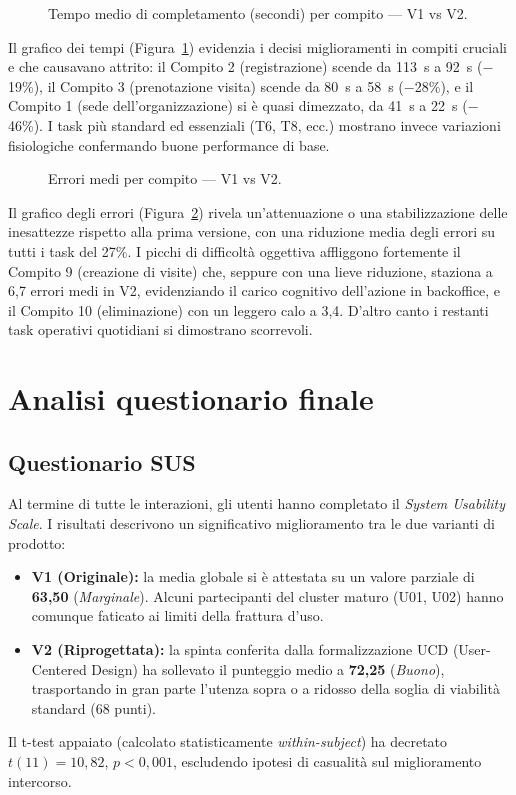\begin{figure}[H]
    \centering
    
    \caption{Tempo medio di completamento (secondi) per compito — V1 vs V2.}
    \label{fig:tempi}
\end{figure}

Il grafico dei tempi (Figura~\ref{fig:tempi}) evidenzia i decisi miglioramenti in compiti cruciali e che causavano attrito: il Compito 2 (registrazione) scende da 113~s a 92~s ($-$19\%), il Compito 3 (prenotazione visita) scende da 80~s a 58~s ($-$28\%), e il Compito 1 (sede dell'organizzazione) si è quasi dimezzato, da 41~s a 22~s ($-$46\%). I task più standard ed essenziali (T6, T8, ecc.) mostrano invece variazioni fisiologiche confermando buone performance di base.

\begin{figure}[H]
    \centering
    
    \caption{Errori medi per compito — V1 vs V2.}
    \label{fig:errori}
\end{figure}

Il grafico degli errori (Figura~\ref{fig:errori}) rivela un'attenuazione o una stabilizzazione delle inesattezze rispetto alla prima versione, con una riduzione media degli errori su tutti i task del 27\%. I picchi di difficoltà oggettiva affliggono fortemente il Compito 9 (creazione di visite) che, seppure con una lieve riduzione, staziona a 6,7 errori medi in V2, evidenziando il carico cognitivo dell'azione in backoffice, e il Compito 10 (eliminazione) con un leggero calo a 3,4. D'altro canto i restanti task operativi quotidiani si dimostrano scorrevoli.

\section{Analisi questionario finale}

\subsection{Questionario SUS}
Al termine di tutte le interazioni, gli utenti hanno completato il \textit{System Usability Scale}. 
I risultati descrivono un significativo miglioramento tra le due varianti di prodotto:
\begin{itemize}
    \item \textbf{V1 (Originale):} la media globale si è attestata su un valore parziale di \textbf{63,50} (\textit{Marginale}). Alcuni partecipanti del cluster maturo (U01, U02) hanno comunque faticato ai limiti della frattura d'uso.
    \item \textbf{V2 (Riprogettata):} la spinta conferita dalla formalizzazione UCD (User-Centered Design) ha sollevato il punteggio medio a \textbf{72,25} (\textit{Buono}), trasportando in gran parte l'utenza sopra o a ridosso della soglia di viabilità standard (68 punti).
\end{itemize}
Il t-test appaiato (calcolato statisticamente \textit{within-subject}) ha decretato $t(11) = 10{,}82$, $p < 0{,}001$, escludendo ipotesi di casualità sul miglioramento intercorso.

